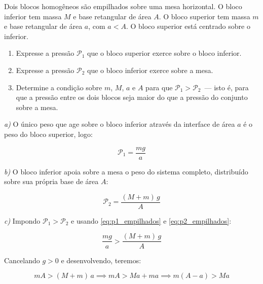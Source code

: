 \begin{exemplo}\label{exemplo_fluidos_pressaoex03}

Dois blocos homogêneos são empilhados sobre uma mesa horizontal. O
bloco inferior tem massa $M$ e base retangular de área $A$. O bloco
superior tem massa $m$ e base retangular de área $a$, com $a < A$.
O bloco superior está centrado sobre o inferior.
 
\begin{enumerate}
    \item [a)] Expresse a pressão $\mathcal{P}_1$ que o bloco superior
          exerce sobre o bloco inferior.
    \item [b)] Expresse a pressão $\mathcal{P}_2$ que o bloco inferior
          exerce sobre a mesa.
    \item [c)] Determine a condição sobre $m$, $M$, $a$ e $A$ para que
          $\mathcal{P}_1 > \mathcal{P}_2$~--- isto é, para que a
          pressão entre os dois blocos seja maior do que a pressão
          do conjunto sobre a mesa.
\end{enumerate}
 

\resolucao

\textit{a)} O único peso que age sobre o bloco inferior através da
interface de área $a$ é o peso do bloco superior, logo:
 
\begin{equation}
    \mathcal{P}_1 = \frac{mg}{a}
    \label{eq:p1_empilhados}
\end{equation}
 
\textit{b)} O bloco inferior apoia sobre a mesa o peso do sistema
completo, distribuído sobre sua própria base de área $A$:
 
\begin{equation}
    \mathcal{P}_2 = \frac{(M + m)\,g}{A}
    \label{eq:p2_empilhados}
\end{equation}
 
\textit{c)} Impondo $\mathcal{P}_1 > \mathcal{P}_2$ e usando
\eqref{eq:p1_empilhados} e \eqref{eq:p2_empilhados}:
 
\begin{equation*}
    \frac{mg}{a} > \frac{(M + m)\,g}{A}
\end{equation*}
 
Cancelando $g > 0$ e desenvolvendo, teremos:
 
\begin{equation*}
    mA > (M + m)\,a
    \implies
    mA > Ma + ma
    \implies
    m(A - a) > Ma
\end{equation*}
 

\end{exemplo}
